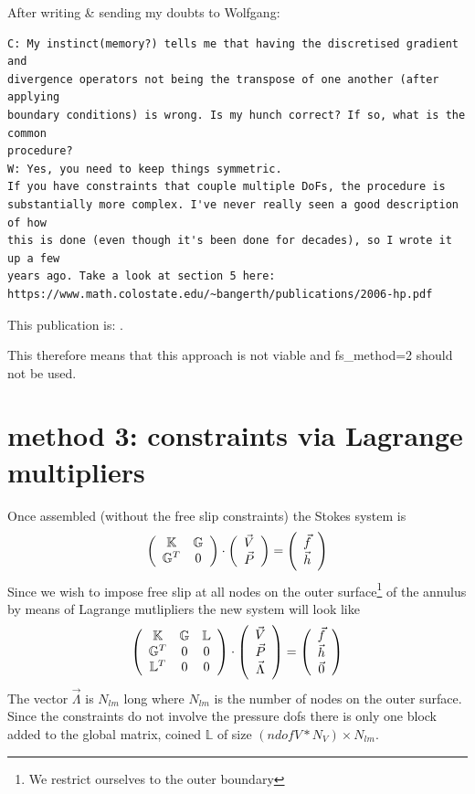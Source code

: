 After writing \& sending my doubts to Wolfgang:
\begin{verbatim}
C: My instinct(memory?) tells me that having the discretised gradient and
divergence operators not being the transpose of one another (after applying
boundary conditions) is wrong. Is my hunch correct? If so, what is the common
procedure? 
W: Yes, you need to keep things symmetric.
If you have constraints that couple multiple DoFs, the procedure is
substantially more complex. I've never really seen a good description of how
this is done (even though it's been done for decades), so I wrote it up a few
years ago. Take a look at section 5 here:
https://www.math.colostate.edu/~bangerth/publications/2006-hp.pdf
\end{verbatim}
This publication is: .

This therefore means that this approach is not viable and {\python fs\_method=2} 
should not be used. 

\section*{method 3: constraints via Lagrange multipliers}

Once assembled (without the free slip constraints) the Stokes system 
is 
\[
\left(
\begin{array}{cc}
{\mathbb{K}} & {\mathbb{G}} \\
{\mathbb{G}}^T & 0
\end{array}
\right)
\cdot
\left(
\begin{array}{c}
\vec{V} \\
\vec{P}
\end{array}
\right)
=\left(
\begin{array}{c}
\vec{f} \\ \vec{h}
\end{array}
\right)
\]
Since we wish to impose free slip at all nodes on the outer surface\footnote{We restrict ourselves to the outer boundary} 
of the annulus by means of Lagrange mutlipliers the new system will 
look like
\[
\left(
\begin{array}{ccc}
{\mathbb{K}} & {\mathbb{G}} & \mathbb{L}\\
{\mathbb{G}}^T & 0 &0 \\
\mathbb{L}^T & 0 & 0
\end{array}
\right)
\cdot
\left(
\begin{array}{c}
\vec{V} \\
\vec{P} \\
\vec{\Lambda}
\end{array}
\right)
=\left(
\begin{array}{c}
\vec{f} \\ \vec{h} \\ \vec{0}
\end{array}
\right)
\]
The vector $\vec\Lambda$ is $N_{lm}$ long where 
$N_{lm}$ is the number of nodes on the outer surface.
Since the constraints do not involve the pressure dofs 
there is only one block added to the global matrix, 
coined $\mathbb{L}$ of size $(ndofV*N_V) \times N_{lm}$.

